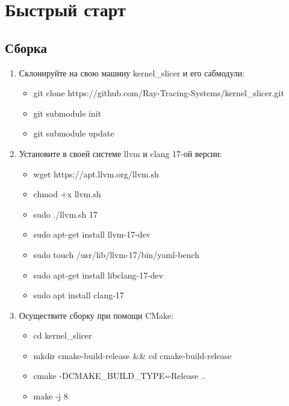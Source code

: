 \documentclass[11pt,fleqn,english,russian]{report} %
\begin{document}



\chapter{Быстрый старт}

\section{Сборка}

\begin{enumerate}
	
\item Склонируйте на свою машину kernel\_slicer и его сабмодули: \begin{itemize}
	\item git clone https://github.com/Ray-Tracing-Systems/kernel\_slicer.git
	\item git submodule init
	\item git submodule update
\end{itemize}

\item Установите в своей системе llvm и clang 17-ой версии: \begin{itemize}
	\item wget https://apt.llvm.org/llvm.sh
	\item chmod +x llvm.sh
	\item sudo ./llvm.sh 17
	\item sudo apt-get install llvm-17-dev
	\item sudo touch /usr/lib/llvm-17/bin/yaml-bench
	\item sudo apt-get install libclang-17-dev
	\item sudo apt install clang-17
\end{itemize}

\item Осуществите сборку при помощи CMake: 
\begin{itemize}
	\item cd kernel\_slicer
    \item mkdir cmake-build-release \&\& cd cmake-build-release
    \item cmake -DCMAKE\_BUILD\_TYPE=Release .. 
    \item make -j 8
\end{itemize}

\end{enumerate}
\end{document}
